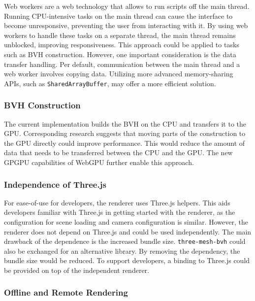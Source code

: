 Web workers are a web technology that allows to run scripts off the main thread. Running \gls{CPU}-intensive tasks on the main thread can cause the interface to become unresponsive, preventing the user from interacting with it. By using web workers to handle these tasks on a separate thread, the main thread remains unblocked, improving responsiveness. This approach could be applied to tasks such as \gls{BVH} construction. However, one important consideration is the data transfer handling. Per default, communication between the main thread and a web worker involves copying data. Utilizing more advanced memory-sharing \glspl{API}, such as \texttt{SharedArrayBuffer}, may offer a more efficient solution.

\subsubsection*{BVH Construction}
\label{sec:bvhConstructionDiscussion}

The current implementation builds the \gls{BVH} on the \gls{CPU} and transfers it to the \gls{GPU}. Corresponding research \cite{lauterbach2009GPUbvh} suggests that moving parts of the construction to the \gls{GPU} directly could improve performance. This would reduce the amount of data that needs to be transferred between the \gls{CPU} and the \gls{GPU}. The new \gls{GPGPU} capabilities of \gls{WebGPU} further enable this approach.

\subsubsection*{Independence of Three.js}

For ease-of-use for developers, the renderer uses \gls{Three.js} helpers. This aids developers familiar with \gls{Three.js} in getting started with the renderer, as the configuration for scene loading and camera configuration is similar. However, the renderer does not depend on \gls{Three.js} and could be used independently. The main drawback of the dependence is the increased bundle size. \texttt{three-mesh-bvh} \cite{threeMeshBvh} could also be exchanged for an alternative library. By removing the dependency, the bundle size would be reduced. To support developers, a binding to \gls{Three.js} could be provided on top of the independent renderer.

\subsubsection*{Offline and Remote Rendering}

